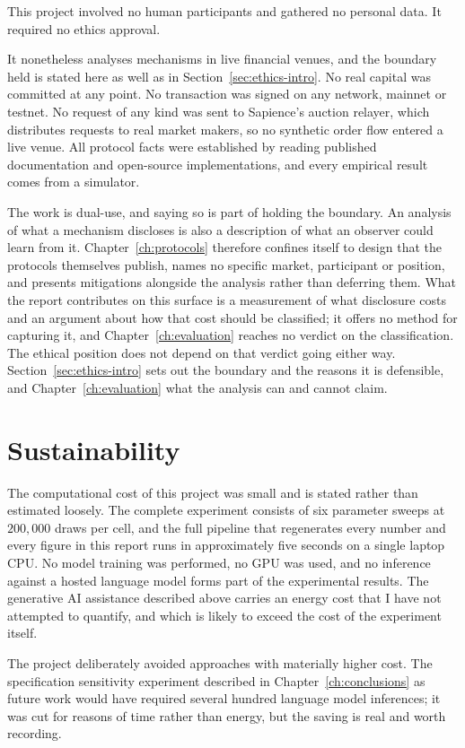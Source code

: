 This project involved no human participants and gathered no personal data. It required no
ethics approval.

It nonetheless analyses mechanisms in live financial venues, and the boundary held is stated
here as well as in Section~\ref{sec:ethics-intro}. No real capital was committed at any
point. No transaction was signed on any network, mainnet or testnet. No request of any kind
was sent to Sapience's auction relayer, which distributes requests to real market makers, so
no synthetic order flow entered a live venue. All protocol facts were established by reading
published documentation and open-source implementations, and every empirical result comes
from a simulator.

The work is dual-use, and saying so is part of holding the boundary. An analysis of what a
mechanism discloses is also a description of what an observer could learn from it.
Chapter~\ref{ch:protocols} therefore confines itself to design that the protocols themselves
publish, names no specific market, participant or position, and presents mitigations
alongside the analysis rather than deferring them. What the report contributes on this
surface is a measurement of what disclosure costs and an argument about how that cost should
be classified; it offers no method for capturing it, and
Chapter~\ref{ch:evaluation} reaches no verdict on the classification. The ethical position
does not depend on that verdict going either way. Section~\ref{sec:ethics-intro} sets out the boundary and the reasons it is
defensible, and Chapter~\ref{ch:evaluation} what the analysis can and cannot claim.

\section*{Sustainability}

The computational cost of this project was small and is stated rather than estimated
loosely. The complete experiment consists of six parameter sweeps at $200{,}000$ draws per
cell, and the full pipeline that regenerates every number and every figure in this report
runs in approximately five seconds on a single laptop CPU. No model training was performed,
no GPU was used, and no inference against a hosted language model forms part of the
experimental results. The generative AI assistance described above carries an energy cost
that I have not attempted to quantify, and which is likely to exceed the cost of the
experiment itself.

The project deliberately avoided approaches with materially higher cost. The specification
sensitivity experiment described in Chapter~\ref{ch:conclusions} as future work would have
required several hundred language model inferences; it was cut for reasons of time rather
than energy, but the saving is real and worth recording.

